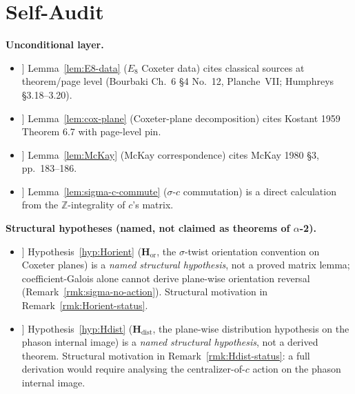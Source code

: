 \documentclass[11pt, a4paper]{amsart}
\theoremstyle{definition}
\newcommand{\Z}{\mathbb{Z}}
\newcommand{\Hor}{\mathbf{H}_{\mathrm{or}}}
\newcommand{\Hdist}{\mathbf{H}_{\mathrm{dist}}}
\begin{document}
\section{Self-Audit}
\label{sec:audit}

\textbf{Unconditional layer.}
\begin{itemize}
\item[[1]] Lemma~\ref{lem:E8-data} ($E_8$ Coxeter data) cites
  classical sources at theorem/page level
  (Bourbaki Ch.~6 \S4 No.~12, Planche~VII; Humphreys
  \S 3.18--3.20).
\item[[2]] Lemma~\ref{lem:cox-plane} (Coxeter-plane
  decomposition) cites Kostant 1959 Theorem 6.7 with
  page-level pin.
\item[[3]] Lemma~\ref{lem:McKay} (McKay correspondence) cites
  McKay 1980 \S3, pp.~183--186.
\item[[4]] Lemma~\ref{lem:sigma-c-commute} ($\sigma$-$c$
  commutation) is a direct calculation from the
  $\Z$-integrality of $c$'s matrix.
\end{itemize}

\textbf{Structural hypotheses (named, not claimed as
theorems of $\alpha$-2).}
\begin{itemize}
\item[[5]] Hypothesis~\ref{hyp:Horient} ($\Hor$, the
  $\sigma$-twist orientation convention on Coxeter planes)
  is a \emph{named structural hypothesis}, not a proved
  matrix lemma; coefficient-Galois alone cannot derive
  plane-wise orientation reversal
  (Remark~\ref{rmk:sigma-no-action}). Structural motivation
  in Remark~\ref{rmk:Horient-status}.
\item[[5b]] Hypothesis~\ref{hyp:Hdist} ($\Hdist$, the
  plane-wise distribution hypothesis on the phason internal
  image) is a \emph{named structural hypothesis}, not a
  derived theorem. Structural motivation in
  Remark~\ref{rmk:Hdist-status}: a full derivation would
  require analysing the centralizer-of-$c$ action on the
  phason internal image.
\end{itemize}
\end{document}
